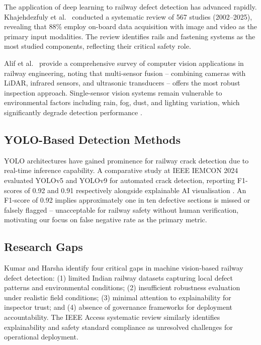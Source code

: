 \documentclass[conference]{IEEE}
\begin{document}
The application of deep learning to railway defect detection has advanced rapidly. Khajehdezfuly et al.\ \cite{khajeh2025} conducted a systematic review of 567 studies (2002--2025), revealing that 88\% employ on-board data acquisition with image and video as the primary input modalities. The review identifies rails and fastening systems as the most studied components, reflecting their critical safety role.

Alif et al.\ \cite{alif2026} provide a comprehensive survey of computer vision applications in railway engineering, noting that multi-sensor fusion -- combining cameras with LiDAR, infrared sensors, and ultrasonic transducers -- offers the most robust inspection approach. Single-sensor vision systems remain vulnerable to environmental factors including rain, fog, dust, and lighting variation, which significantly degrade detection performance \cite{alif2026}.

\subsection{YOLO-Based Detection Methods}

YOLO architectures have gained prominence for railway crack detection due to real-time inference capability. A comparative study at IEEE IEMCON 2024 evaluated YOLOv5 and YOLOv9 for automated crack detection, reporting F1-scores of 0.92 and 0.91 respectively alongside explainable AI visualisation \cite{yolo2024}. An F1-score of 0.92 implies approximately one in ten defective sections is missed or falsely flagged -- unacceptable for railway safety without human verification, motivating our focus on false negative rate as the primary metric.

\subsection{Research Gaps}

Kumar and Harsha \cite{kumar2025} identify four critical gaps in machine vision-based railway defect detection: (1) limited Indian railway datasets capturing local defect patterns and environmental conditions; (2) insufficient robustness evaluation under realistic field conditions; (3) minimal attention to explainability for inspector trust; and (4) absence of governance frameworks for deployment accountability. The IEEE Access systematic review \cite{ieee2025} similarly identifies explainability and safety standard compliance as unresolved challenges for operational deployment.
\end{document}

